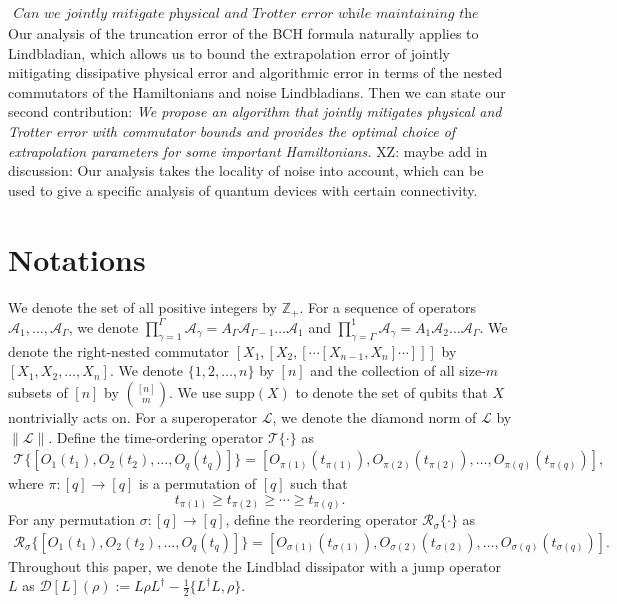 \documentclass[11pt]{article}
\newcommand{\A}{\mathcal{A}}
\newcommand{\supp}{\mathrm{supp}}
\newcommand{\mc}{\mathcal}
\newcommand{\mb}{\mathbb}
\newcommand{\xz}[1]{{\color{cyan} XZ: #1}}
\begin{document}
\begin{itemize}
\begin{align*}
        \textit{Can we jointly mitigate physical and Trotter error while maintaining the commutator bound?}
    \end{align*}Our analysis of the truncation error of the BCH formula naturally applies to Lindbladian, which allows us to bound the extrapolation error of jointly mitigating dissipative physical error and algorithmic error in terms of the nested commutators of the Hamiltonians and noise Lindbladians. Then we can state our second contribution: \emph{We propose an algorithm that jointly mitigates physical and Trotter error with commutator bounds and provides the optimal choice of extrapolation parameters for some important Hamiltonians.} \xz{maybe add in discussion: Our analysis takes the locality of noise into account, which can be used to give a specific analysis of quantum devices with certain connectivity. }
\end{itemize}



\section{Notations}
We denote the set of all positive integers by $\mb{Z}_+$. For a sequence of operators $\A_1, \ldots, \A_{\Gamma}$, we denote $\prod_{\gamma=1}^\Gamma \A_{\gamma}= A_{\Gamma}\A_{\Gamma-1} \ldots \A_1$ and $\prod_{\gamma=\Gamma}^1 \A_{\gamma}= A_{1}\A_{2} \ldots \A_\Gamma$. We denote the right-nested commutator $[X_1, [X_2, [\cdots[X_{n-1}, X_n]\cdots]]]$ by $[X_1, X_2, \ldots, X_n]$. We denote $\{1, 2, \ldots, n\}$ by $[n]$ and the collection of all size-$m$ subsets of $[n]$ by $\binom{[n]}{m}$. We use $\supp(X)$ to denote the set of qubits that $X$ nontrivially acts on.  For a superoperator $\mc L$, we denote the diamond norm of $\mc L$ by $\|\mc L\|$.
Define the time-ordering operator $\mc T\{\cdot\}$ as \begin{align*}
    \mc T\big\{[O_1(t_1),O_2(t_2),\ldots, O_q(t_q) ]\big\} = [O_{\pi(1)}(t_{\pi(1)}),O_{\pi(2)}(t_{\pi(2)}),\ldots, O_{\pi(q)}(t_{\pi(q)})],
\end{align*}
where $\pi\colon [q]\to[q]$ is a permutation of $[q]$ such that \[
    t_{\pi(1)}\ge t_{\pi(2)}\ge \cdots \ge t_{\pi(q)}.
    \]
For any permutation $\sigma\colon [q]\to [q]$, define the reordering operator $\mc R_{\sigma}\{\cdot\}$ as \begin{align*}
    \mc R_{\sigma}\big\{[O_1(t_1),O_2(t_2),\ldots, O_q(t_q)]\big\} = [O_{\sigma(1)}(t_{\sigma(1)}),O_{\sigma(2)}(t_{\sigma(2)}),\ldots, O_{\sigma(q)}(t_{\sigma(q)})].
\end{align*}
Throughout this paper, we denote the Lindblad dissipator with a jump operator $L$ as $\mathcal{D}[L](\rho) := L\rho L^\dagger - \frac{1}{2}\{L^\dagger L, \rho\}$.
\end{document}
